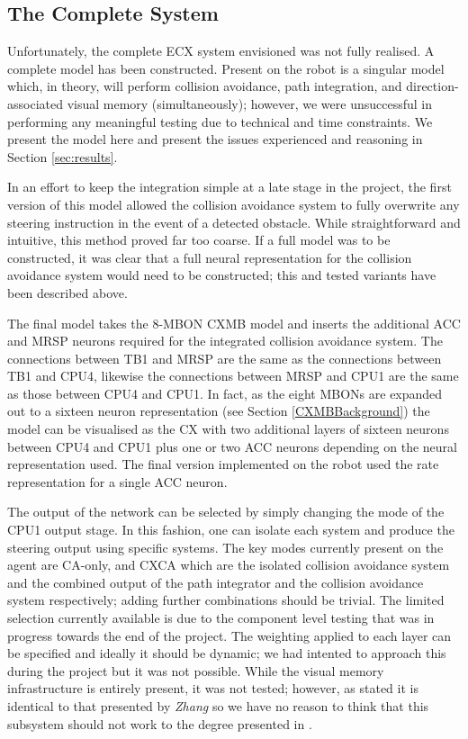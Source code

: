 \documentclass[a4paper,11pt,twoside,openright]{article}
\begin{document}
\subsection{ The Complete System}
Unfortunately, the complete ECX system envisioned was not fully realised. A
complete model has been constructed. Present on the robot is a singular model
which, in theory, will perform collision avoidance, path integration, and
direction-associated visual memory (simultaneously); however, we were
unsuccessful in performing any meaningful testing due to technical and time
constraints. We present the model here and present the issues experienced and
reasoning in Section \ref{sec:results}.
\newline\par

In an effort to keep the integration simple at a late stage in the project,
the first version of this model allowed the collision avoidance system to fully
overwrite any steering instruction in the event of a detected obstacle. While
straightforward and intuitive, this method proved far too coarse. If a full
model was to be constructed, it was clear that a full neural representation
for the collision avoidance system would need to be constructed; this and
tested variants have been described above.
\newline\par

The final model takes the 8-MBON CXMB model and inserts the additional ACC and
MRSP neurons required for the integrated collision avoidance system. The
connections between TB1 and MRSP are the same as the connections between TB1
and CPU4, likewise the connections between MRSP and CPU1 are the same as those
between CPU4 and CPU1. In fact, as the eight MBONs are expanded out to a
sixteen neuron representation (see Section \ref{CXMBBackground}) the
model can be visualised as the CX with two additional layers of sixteen neurons
between CPU4 and CPU1 plus one or two ACC neurons depending on the neural
representation used. The final version implemented on the robot used the rate
representation for a single ACC neuron.
\newline\par

The output of the network can be selected by simply changing the mode of the
CPU1 output stage. In this fashion, one can isolate each system and produce
the steering output using specific systems. The key modes currently present on
the agent are CA-only, and CXCA which are the isolated collision avoidance system
and the combined output of the path integrator and the collision avoidance
system respectively; adding further combinations should be trivial. The limited
selection currently available is due to the component level testing that
was in progress towards the end of the project. The weighting applied to each
layer can be specified and ideally it should be dynamic; we had intented to
approach this during the project but it was not possible. While the visual
memory infrastructure is entirely present, it was not tested; however, as stated
it is identical to that presented by \textit{Zhang} so we have no reason to
think that this subsystem should not work to the degree presented in
\cite{Zhang2017}.
\end{document}
